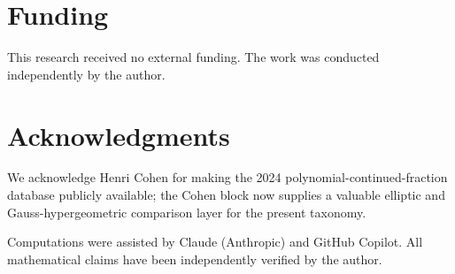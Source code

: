 \documentclass[11pt]{article}
\begin{document}
\section*{Funding}
This research received no external funding. The work was conducted 
independently by the author.

\section*{Acknowledgments}
We acknowledge Henri Cohen for making the 2024 polynomial-continued-fraction database publicly available; the Cohen block now supplies a valuable elliptic and Gauss-hypergeometric comparison layer for the present taxonomy.

Computations were assisted by Claude (Anthropic) and GitHub
Copilot. All mathematical claims have been independently verified
by the author.



\end{document}
